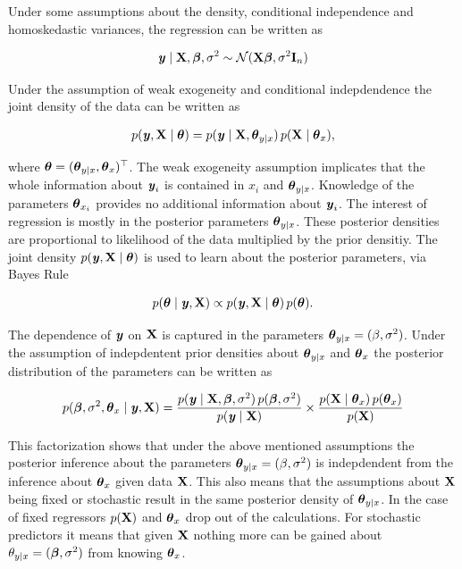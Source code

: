 \documentclass[11pt,a4paper,twoside]{book}\usepackage[]{graphicx}\usepackage[]{color}
\begin{document}
Under some assumptions about the density, conditional independence and homoskedastic variances, the regression can be written as

       \begin{align} 
{\textbf{\textit{y}}} \mid {\mathbf{X}} , {\boldsymbol{\beta}}, \sigma^2 \sim \mathcal{N}({\mathbf{X}} {\boldsymbol{\beta}} , \sigma^2 {\mathbf{I}}_{n})
   \end{align}

Under the assumption of weak exogeneity and conditional indepdendence the joint density of the data can be written as

       \begin{align} 
p({\textbf{\textit{y}}}, {\mathbf{X}} \mid {\boldsymbol{\theta}}{}) = p({\textbf{\textit{y}}} \mid {\mathbf{X}}, {\boldsymbol{\theta}}{}_{y \mid x}) \, p({\mathbf{X}} \mid {\boldsymbol{\theta}}{}_{x}),
   \end{align}

where ${\boldsymbol{\theta}}{} = ({\boldsymbol{\theta}}{}_{y \mid x}, {\boldsymbol{\theta}}{}_{x})^\top$. The weak exogeneity assumption implicates that the whole information about ${\textbf{\textit{y}}}_{i}$ is contained in $x_{i}$ and ${\boldsymbol{\theta}}{}_{y \mid x}$. Knowledge of the parameters ${\boldsymbol{\theta}}{}_{x_{i}}$ provides no additional information about ${\textbf{\textit{y}}}_{i}$.
The interest of regression is mostly in the posterior parameters ${\boldsymbol{\theta}}{}_{y \mid x}$. These posterior densities are proportional to  likelihood of the data  multiplied by the prior densitiy. The joint density $p({\textbf{\textit{y}}}, {\mathbf{X}} \mid  {\boldsymbol{\theta}}{})$ is used to learn about the posterior parameters, via Bayes Rule

       \begin{align} 
p({\boldsymbol{\theta}}{} \mid {\textbf{\textit{y}}}, {\mathbf{X}}) \propto p({\textbf{\textit{y}}}, {\mathbf{X}} \mid  {\boldsymbol{\theta}}{}) \, p({\boldsymbol{\theta}}{}).
   \end{align}
   
   The dependence of ${\textbf{\textit{y}}}$ on ${\mathbf{X}}$ is captured in the parameters ${\boldsymbol{\theta}}{}_{y \mid x} = (\beta, \sigma^2)$. Under the assumption of indepdentent prior densities about ${\boldsymbol{\theta}}{}_{y \mid x}$ and ${\boldsymbol{\theta}}{}_{x}$ the posterior distribution of the parameters can be written as
   
          \begin{align} 
p({\boldsymbol{\beta}}, \sigma^2, {\boldsymbol{\theta}}{}_{x} \mid {\textbf{\textit{y}}}, {\mathbf{X}}) = \frac{p({\textbf{\textit{y}}} \mid {\mathbf{X}}, {\boldsymbol{\beta}}, \sigma^2) \, p({\boldsymbol{\beta}}, \sigma^2)}{p({\textbf{\textit{y}}} \mid {\mathbf{X}})} \times \frac{p({\mathbf{X}} \mid {\boldsymbol{\theta}}{}_{x}) \, p({\boldsymbol{\theta}}{}_{x})}{p({\mathbf{X}})}
   \end{align}
   
  This factorization shows that under the above mentioned assumptions the posterior inference about the parameters ${\boldsymbol{\theta}}{}_{y \mid x} = (\beta, \sigma^2)$ is indepdendent from the inference about ${\boldsymbol{\theta}}{}_{x}$ given data ${\mathbf{X}}$. This also means that the assumptions about ${\mathbf{X}}$ being fixed or stochastic result in the same posterior density of  ${\boldsymbol{\theta}}{}_{y \mid x}$. In the case of fixed regressors $p({\mathbf{X}})$ and ${\boldsymbol{\theta}}{}_{x}$ drop out of the calculations. For stochastic predictors it means that given ${\mathbf{X}}$ nothing more can be gained about $\theta_{y \mid x} = ({\boldsymbol{\beta}}, \sigma^2)$ from knowing ${\boldsymbol{\theta}}{}_{x}$. 
  
\end{document}
